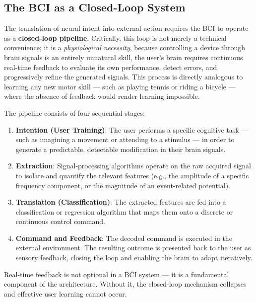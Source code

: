 \documentclass[10pt, letterpaper]{report}
\begin{document}
\subsection{The BCI as a Closed-Loop System}

The translation of neural intent into external action requires the BCI to operate as a
\textbf{closed-loop pipeline}. Critically, this loop is not merely a technical convenience; it
is a \emph{physiological necessity}, because controlling a device through brain signals is
an entirely unnatural skill, the user's brain requires continuous real-time feedback to
evaluate its own performance, detect errors, and progressively refine the generated signals.
This process is directly analogous to learning any new motor skill — such as playing tennis
or riding a bicycle — where the absence of feedback would render learning impossible.

\noindent The pipeline consists of four sequential stages:

\begin{enumerate}
  \item \textbf{Intention (User Training)}: The user performs a specific cognitive task —
  such as imagining a movement or attending to a stimulus — in order to generate a
  predictable, detectable modification in their brain signals.

  \item \textbf{Extraction}: Signal-processing algorithms operate on the raw acquired
  signal to isolate and quantify the relevant features (e.g., the amplitude of a specific
  frequency component, or the magnitude of an event-related potential).

  \item \textbf{Translation (Classification)}: The extracted features are fed into a
  classification or regression algorithm that maps them onto a discrete or continuous
  control command.

  \item \textbf{Command and Feedback}: The decoded command is executed in the
  external environment. The resulting outcome is presented back to the user as sensory
  feedback, closing the loop and enabling the brain to adapt iteratively.
\end{enumerate}

\begin{boxobservation}{}{}
Real-time feedback is not optional in a BCI system — it is a fundamental component of
the architecture. Without it, the closed-loop mechanism collapses and effective user
learning cannot occur.
\end{boxobservation}
\end{document}
